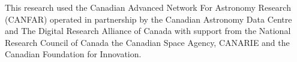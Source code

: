\documentclass{aastex631}
\begin{document}
This research used the Canadian Advanced Network For Astronomy Research (CANFAR) operated in partnership by the Canadian Astronomy Data Centre and The Digital Research Alliance of Canada with support from the National Research Council of Canada the Canadian Space Agency, CANARIE and the Canadian Foundation for Innovation.

\clearpage





\clearpage


\end{document}
